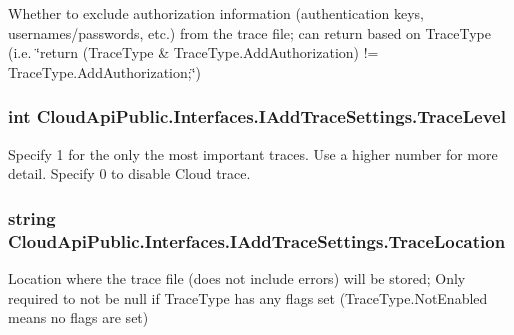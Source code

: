 Whether to exclude authorization information (authentication keys, usernames/passwords, etc.) from the trace file; can return based on Trace\-Type (i.\-e. \char`\"{}return (\-Trace\-Type \& Trace\-Type.\-Add\-Authorization) != Trace\-Type.\-Add\-Authorization;\char`\"{}) 

\hypertarget{interface_cloud_api_public_1_1_interfaces_1_1_i_add_trace_settings_aafa54c3e44b46a667daf7219dcbce0ce}{
\subsubsection[{Trace\-Level}]{\setlength{\rightskip}{0pt plus 5cm}int Cloud\-Api\-Public.\-Interfaces.\-I\-Add\-Trace\-Settings.\-Trace\-Level\hspace{0.3cm}{\ttfamily [get]}}}\label{interface_cloud_api_public_1_1_interfaces_1_1_i_add_trace_settings_aafa54c3e44b46a667daf7219dcbce0ce}


Specify 1 for the only the most important traces. Use a higher number for more detail. Specify 0 to disable Cloud trace. 

\hypertarget{interface_cloud_api_public_1_1_interfaces_1_1_i_add_trace_settings_a5a3de8f9ca58461e90bdaa48538596e3}{
\subsubsection[{Trace\-Location}]{\setlength{\rightskip}{0pt plus 5cm}string Cloud\-Api\-Public.\-Interfaces.\-I\-Add\-Trace\-Settings.\-Trace\-Location\hspace{0.3cm}{\ttfamily [get]}}}\label{interface_cloud_api_public_1_1_interfaces_1_1_i_add_trace_settings_a5a3de8f9ca58461e90bdaa48538596e3}


Location where the trace file (does not include errors) will be stored; Only required to not be null if Trace\-Type has any flags set (Trace\-Type.\-Not\-Enabled means no flags are set) 

